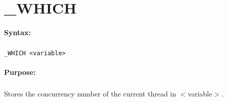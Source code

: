 
\newpage
\section{\_WHICH}
\label{cmd:_WHICH}

\paragraph{Syntax:}
\subparagraph{}
\texttt{\_WHICH <variable>}

\paragraph{Purpose:}
\subparagraph{}
Stores the concurrency number of the current thread 
in $<$variable$>$.
